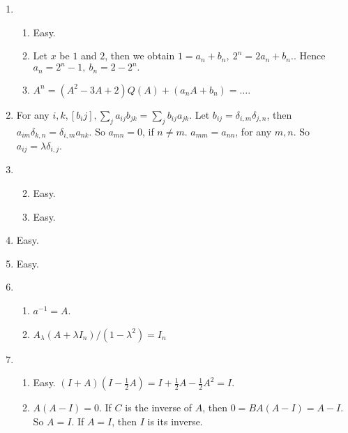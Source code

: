 \documentclass[12pt]{article}
\begin{document}
\begin{enumerate}
    \item \begin{enumerate}
        \item Easy.
        \item Let $x$ be $1$ and $2$, then we obtain $1=a_n+b_n,\ 2^n=2a_n+b_n.$. Hence $a_n=2^n-1,\  b_n=2-2^n.$
        \item $A^n=\left(A^2-3A+2\right)Q(A)+(a_n A+b_n)=\dots.$
    \end{enumerate}
    \item For any $i,k,[b_ij],\sum_{j}a_{ij}b_{jk}=\sum_{j}b_{ij}a_{jk}$. Let $b_{ij}=\delta_{i,m}\delta_{j,n}$, then $a_{im}\delta_{k,n}=\delta_{i,m}a_{nk}$. So $a_{mn}=0$, if $n\not=m$. $a_{mm}=a_{nn}$, for any $m,n$. So $a_{ij}=\lambda \delta_{i,j}$.
    \item \begin{enumerate}
        \setcounter{enumii}{1}
        \item Easy.
        \item Easy.
    \end{enumerate}
    \item Easy.
    \setcounter{enumi}{16}
    \item Easy.
    \item \begin{enumerate}
        \item $a^{-1}=A$.
        \item $A_\lambda\left(A+\lambda I_n\right)/\left(1-\lambda^2\right)=I_n$
    \end{enumerate}
    \item \begin{enumerate}
        \item Easy. $(I+A)(I-\frac{1}{2}A)=I+\frac{1}{2}A-\frac{1}{2}A^2=I.$
        \item $A(A-I)=0$. If $C$ is the inverse of $A$, then $0=BA(A-I)=A-I$. So $A=I$. If $A=I$, then $I$ is its inverse.
    \end{enumerate}
\end{enumerate}
\end{document}
